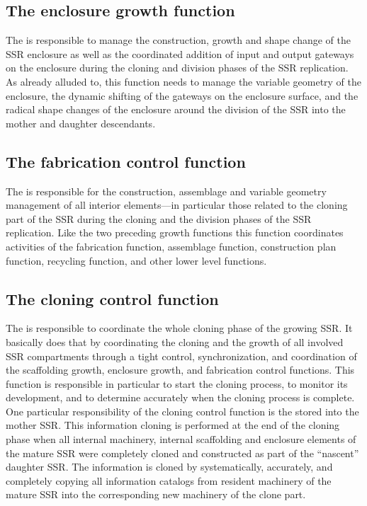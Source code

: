 \subsection[The enclosure growth function]{The enclosure growth
function}

The  is responsible to manage 
the construction, growth and shape
change of the SSR enclosure as well as the coordinated addition of
input and output gateways on the enclosure during the cloning and
division phases of the SSR replication. As already alluded to, this
function needs to manage the variable geometry of the enclosure, the
dynamic shifting of the gateways on the enclosure surface, and the
radical shape changes of the enclosure around the division of the SSR
into the mother and daughter descendants.

\subsection[The fabrication control function]{The fabrication control
function}

The  is responsible for the construction, assemblage and variable
geometry management of all interior elements---in particular those
related to the cloning part of the SSR during the cloning and the
division phases of the SSR replication.  Like the two preceding growth
functions this function coordinates activities of the fabrication
function, assemblage function, construction plan function, recycling
function, and other lower level functions. 

\subsection[The cloning control function]{The cloning control function}

The  is responsible to coordinate the whole cloning phase of the
growing SSR. It basically does that by coordinating the cloning and the
growth of all involved SSR compartments through a tight control,
synchronization, and coordination of the scaffolding growth, enclosure
growth, and fabrication control functions. This function is responsible
in particular to start the cloning process, to monitor its development,
and to determine accurately when the cloning process is complete. One
particular responsibility of the cloning control function is the
 stored into the mother SSR. This
information cloning is performed at the end of the cloning phase when
all internal machinery, internal scaffolding and enclosure elements of
the mature SSR were completely cloned and constructed as part of the
“nascent” daughter SSR. The information is cloned by systematically,
accurately, and completely copying all information catalogs from
resident machinery of the mature SSR into the corresponding new
machinery of the clone part.

